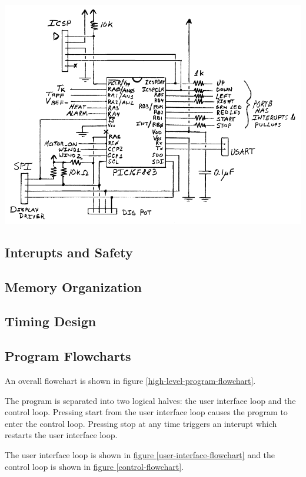 \documentclass[10pt, twocolumn]{article}
\begin{document}
\begin{center}
	\includegraphics[width=\columnwidth]{Figures/pic16f883-circuit.pdf}
	\label{pic16f883-circuit}
\end{center}

\subsection{Interupts and Safety}

\subsection{Memory Organization}

\subsection{Timing Design}

\subsection{Program Flowcharts}

An overall flowchart is shown in figure
\ref{high-level-program-flowchart}.

The program is separated into two logical halves:
the user interface loop and the control loop.
Pressing start from the user interface loop causes the
program to enter the control loop.
Pressing stop at any time triggers an interupt which
restarts the user interface loop.

The user interface loop is shown in
\hyperref[user-interface-flowchart]{figure \ref{user-interface-flowchart}}
and the control loop is shown in
\hyperref[control-flowchart]{figure \ref{control-flowchart}}.
\end{document}
